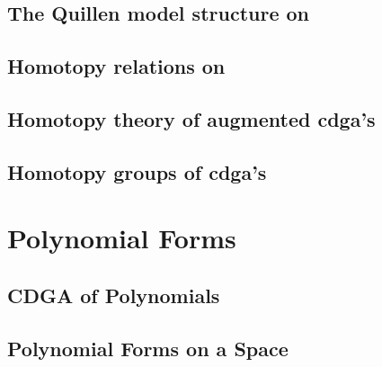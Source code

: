 \section{The Quillen model structure on \titleCDGA}


\section{Homotopy relations on \titleCDGA}


\section{Homotopy theory of augmented cdga's}


\section{Homotopy groups of cdga's}



\chapter{Polynomial Forms}
\label{sec:cdga-of-polynomials}

\section{CDGA of Polynomials}


\section{Polynomial Forms on a Space}
\label{sec:polynomial-forms}





